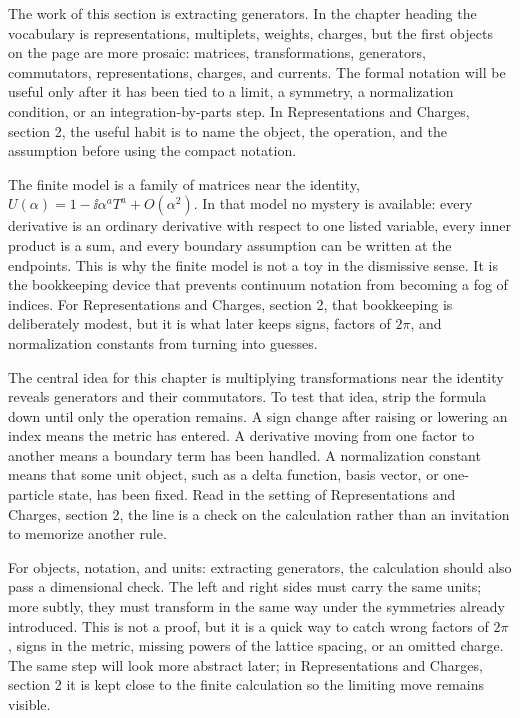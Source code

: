 The work of this section is extracting generators.  In the chapter heading the vocabulary is representations, multiplets, weights, charges, but the first objects on the page are more prosaic: matrices, transformations, generators, commutators, representations, charges, and currents.  The formal notation will be useful only after it has been tied to a limit, a symmetry, a normalization condition, or an integration-by-parts step.  In Representations and Charges, section 2, the useful habit is to name the object, the operation, and the assumption before using the compact notation.

The finite model is a family of matrices near the identity, \(U(\alpha)=1-\ii\alpha^aT^a+O(\alpha^2)\).  In that model no mystery is available: every derivative is an ordinary derivative with respect to one listed variable, every inner product is a sum, and every boundary assumption can be written at the endpoints.  This is why the finite model is not a toy in the dismissive sense.  It is the bookkeeping device that prevents continuum notation from becoming a fog of indices.  For Representations and Charges, section 2, that bookkeeping is deliberately modest, but it is what later keeps signs, factors of \(2\pi\), and normalization constants from turning into guesses.

The central idea for this chapter is multiplying transformations near the identity reveals generators and their commutators.  To test that idea, strip the formula down until only the operation remains.  A sign change after raising or lowering an index means the metric has entered.  A derivative moving from one factor to another means a boundary term has been handled.  A normalization constant means that some unit object, such as a delta function, basis vector, or one-particle state, has been fixed.  Read in the setting of Representations and Charges, section 2, the line is a check on the calculation rather than an invitation to memorize another rule.

For objects, notation, and units: extracting generators, the calculation should also pass a dimensional check.  The left and right sides must carry the same units; more subtly, they must transform in the same way under the symmetries already introduced.  This is not a proof, but it is a quick way to catch wrong factors of \(2\pi\), signs in the metric, missing powers of the lattice spacing, or an omitted charge.  The same step will look more abstract later; in Representations and Charges, section 2 it is kept close to the finite calculation so the limiting move remains visible.

